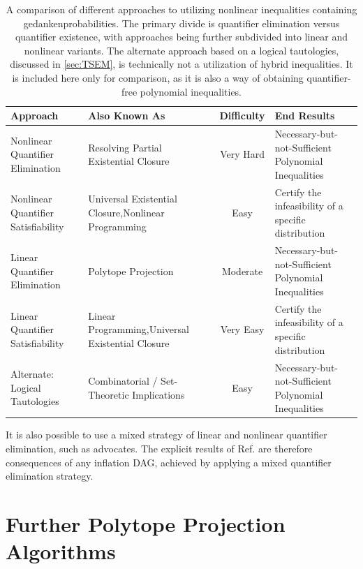 \begin{table}[ht]\centering\caption{A comparison of different approaches to utilizing nonlinear inequalities containing gedankenprobabilities. The primary divide is quantifier elimination versus quantifier existence, with approaches being further subdivided into linear and nonlinear variants. The alternate approach based on a logical tautologies, discussed in \cref{sec:TSEM}, is technically not a utilization of hybrid inequalities. It is included here only for comparison, as it is also a way of obtaining quantifier-free polynomial inequalities.}
\begin{tabularx}{\linewidth}{ |l|L|c|L| } 
\hline
Approach & Also Known As & Difficulty & End Results \\
\bottomrule
Nonlinear Quantifier Elimination & Resolving Partial Existential Closure & Very Hard & Necessary-but-not-Sufficient Polynomial Inequalities \\
\hline
Nonlinear Quantifier Satisfiability & Universal Existential Closure,\newline Nonlinear Programming & Easy & Certify the infeasibility of a specific distribution \\
\hline
Linear Quantifier Elimination & Polytope Projection & Moderate & Necessary-but-not-Sufficient Polynomial Inequalities \\
\hline
Linear Quantifier Satisfiability & Linear Programming,\newline Universal Existential Closure & Very Easy & Certify the infeasibility of a specific distribution \\
\hline
Alternate: Logical Tautologies & Combinatorial / Set-Theoretic Implications & Easy & Necessary-but-not-Sufficient Polynomial Inequalities 
\\\toprule
\end{tabularx}
\end{table}

It is also possible to use a mixed strategy of linear and nonlinear quantifier elimination, such as \citet{ChavesPolynomial} advocates. The explicit results of Ref. \cite{ChavesPolynomial} are therefore consequences of any inflation DAG, achieved by applying a mixed quantifier elimination strategy.


\section{Further Polytope Projection Algorithms}\label{sec:projalgorithms}

